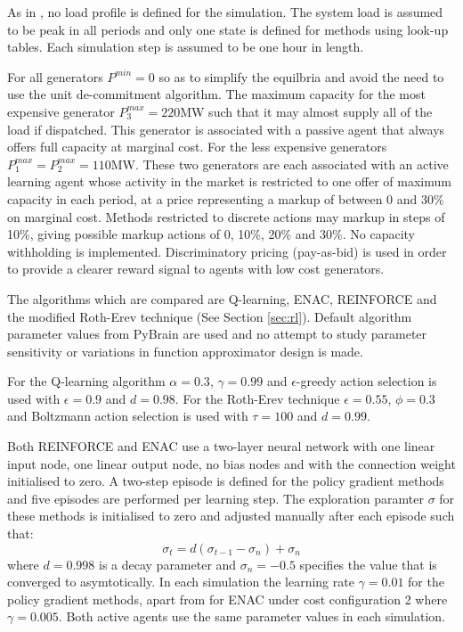 As in , no load profile is defined for the simulation. The
system load is assumed to be peak in all periods and only one state is defined
for methods using look-up tables.  Each simulation step is assumed to be one
hour in length.

For all generators $P^{min}=0$ so as to simplify the equilbria and avoid the
need to use the unit de-commitment algorithm.  The maximum capacity for the most
expensive generator $P^{max}_3=220$MW such that it may almost supply all of the
load if dispatched.  This generator is associated with a passive agent that
always offers full capacity at marginal cost.  For the less expensive generators
$P^{max}_1=P^{max}_2=110$MW.  These two generators are each associated with an
active learning agent whose activity in the market is restricted to one offer of
maximum capacity in each period, at a price representing a markup of between 0
and 30\% on marginal cost.  Methods restricted to discrete actions may markup in
steps of 10\%, giving possible markup actions of 0, 10\%, 20\% and 30\%.  No
capacity withholding is implemented.
Discriminatory pricing (pay-as-bid) is used in order to provide a clearer reward
signal to agents with low cost generators.

The algorithms which are compared are Q-learning, ENAC, REINFORCE and the
modified Roth-Erev technique (See Section \ref{sec:rl}). Default algorithm
parameter values from PyBrain are used and no attempt to study parameter sensitivity or variations in function approximator
design is made.

For the Q-learning algorithm $\alpha=0.3$, $\gamma=0.99$ and $\epsilon$-greedy
action selection is used with $\epsilon=0.9$ and $d=0.98$.  For the Roth-Erev
technique $\epsilon=0.55$, $\phi=0.3$ and Boltzmann action selection is used
with $\tau=100$ and $d=0.99$.

Both REINFORCE and ENAC use a two-layer neural network with one linear input
node, one linear output node, no bias nodes and with the connection weight
initialised to zero.  A two-step episode is defined for the policy gradient methods and five
episodes are performed per learning step.  The exploration paramter $\sigma$ for
these methods is initialised to zero and adjusted manually after each episode
such that:
\begin{equation}
\label{eq:sigmadecay}
\sigma_{t} = d(\sigma_{t-1}-\sigma_{n})+\sigma_{n}
\end{equation}
where $d=0.998$ is a decay parameter and $\sigma_{n}=-0.5$ specifies the
value that is converged to asymtotically.  In each simulation the learning rate
$\gamma=0.01$ for the policy gradient methods, apart from for ENAC under cost
configuration 2 where $\gamma=0.005$.  Both active agents use the same
parameter values in each simulation.

